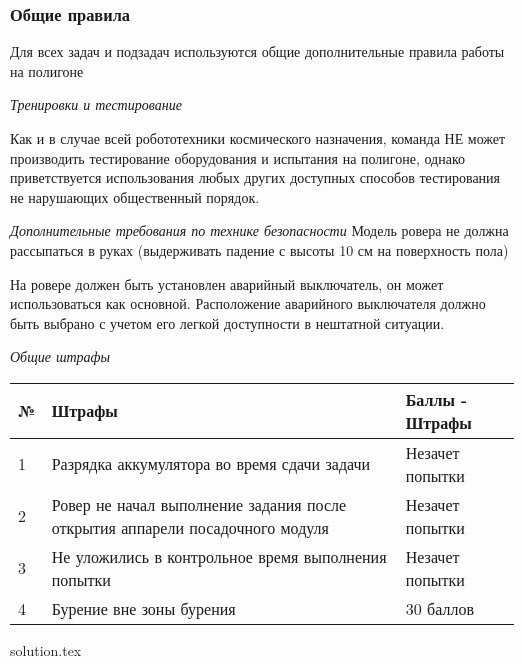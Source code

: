 \subsubsection*{Общие правила}

Для всех задач и подзадач используются общие дополнительные правила работы на полигоне

\textit{Тренировки и тестирование}

Как и в случае всей робототехники космического назначения, команда НЕ может производить тестирование оборудования и испытания на полигоне, однако приветствуется использования любых других доступных способов тестирования не нарушающих общественный порядок.

\textit{Дополнительные требования по технике безопасности} 
Модель ровера  не должна рассыпаться в руках (выдерживать падение с высоты 10 см на поверхность пола)

На ровере должен быть установлен аварийный выключатель, он может использоваться как основной. Расположение аварийного выключателя должно быть выбрано с учетом его легкой доступности в нештатной ситуации.

\textit{Общие штрафы}

\begin{center}
    \begin{tabular}{|p{0.5cm}|p{8.5cm}|p{3.5cm}|}
        \hline
        № & Штрафы & Баллы - Штрафы \\
        \hline
        1 & Разрядка аккумулятора во время сдачи задачи & 	Незачет попытки \\
        \hline
        2 & Ровер не начал выполнение задания после открытия аппарели посадочного модуля & Незачет попытки \\
        \hline
        3 & Не уложились в контрольное время выполнения попытки & Незачет попытки \\
        \hline
        4 & Бурение вне зоны бурения & 30 баллов \\
        \hline
    \end{tabular}
\end{center}

{solution.tex}